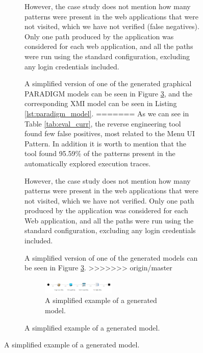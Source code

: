 \documentclass[conference]{IEEEtran}
\begin{document}
\begin{enumerate}
\begin{figure}[!htb]
\begin{itemize}
\begin{figure}[!htb]
\begin{itemize}
However, the case study does not mention how many patterns were present in the web applications that were not visited, which we have not verified (false negatives). Only one path produced by the application was considered for each web application, and all the paths were run using the standard configuration, excluding any login credentials included.

A simplified version of one of the generated graphical PARADIGM models can be seen in Figure \ref{fig:pbgt-me}, and the corresponding XMI model can be seen in Listing \ref{lst:paradigm_model}.
=======
As we can see in Table \ref{tab:eval_curr}, the reverse engineering tool found few false positives, most related to the Menu UI Pattern. In addition it is worth to mention that the tool found 95.59\% of the  patterns present in the automatically explored execution traces.

However, the case study does not mention how many patterns were present in the web applications that were not visited, which we have not verified. Only one path produced by the application was considered for each Web application, and all the paths were run using the standard configuration, excluding any login credentials included.

A simplified version of one of the generated models can be seen in Figure \ref{fig:pbgt-me}.
>>>>>>> origin/master

\begin{figure}[!htb]
\centering
\includegraphics[width=0.5\textwidth]{pbgt-me.png}
\caption{A simplified example of a generated model.}
\label{fig:pbgt-me}
\end{figure}


\end{itemize}
\end{figure}
\end{itemize}
\end{figure}
\end{enumerate}
\end{document}
